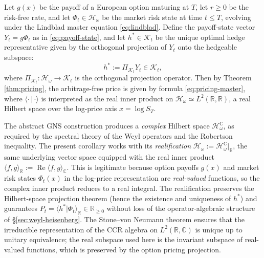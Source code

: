 \begin{corollary}
\label{cor:state-hedge-pricing}
Let $g(x)$ be the payoff of a European option maturing at $T$, let $r \geq 0$ be
the risk-free rate, and let $\Phi_t \in \mathcal{H}_\omega$ be the market risk
state at time $t \leq T$, evolving under the Lindblad master equation
\eqref{eq:lindblad}. Define the payoff-state vector $Y_t = g \Phi_t$ as in
\eqref{eq:payoff-state}, and let $h^* \in \mathcal{K}_t$ be the unique optimal
hedge representative given by the orthogonal projection of $Y_t$ onto the hedgeable
subspace:
\begin{equation}\label{eq:optimal-hedge-time}
    h^* := \Pi_{\mathcal{K}_t} Y_t \in \mathcal{K}_t,
\end{equation}
where $\Pi_{\mathcal{K}_t} : \mathcal{H}_\omega \to \mathcal{K}_t$ is the
orthogonal projection operator. Then by Theorem \ref{thm:pricing}, the
arbitrage-free price is given by formula \eqref{eq:pricing-master}, where
$\langle \cdot \,|\, \cdot \rangle$ is interpreted as the real inner product on
$\mathcal{H}_\omega \simeq L^2(\mathbb{R}, \mathbb{R})$, a real Hilbert space over
the log-price axis $x = \log S_T$.

\begin{remark}\label{rem:real-vs-complex}
The abstract GNS construction produces a \emph{complex} Hilbert space
$\mathcal{H}_\omega^{\mathbb{C}}$, as required by the spectral theory of the
Weyl operators and the Robertson inequality. The present corollary works
with its \emph{realification}
$\mathcal{H}_\omega := \mathcal{H}_\omega^{\mathbb{C}}|_{\mathbb{R}}$,
the same underlying vector space equipped with the real inner product
$\langle f,g\rangle_{\mathbb{R}} := \operatorname{Re}\langle f,g\rangle_{\mathbb{C}}$.
This is legitimate because option payoffs $g(x)$ and market risk states $\Phi_t(x)$
in the log-price representation are \emph{real-valued} functions, so the complex
inner product reduces to a real integral. The realification preserves the
Hilbert-space projection theorem (hence the existence and uniqueness of $h^*$)
and guarantees $P_t = \langle h^*|\Phi_t\rangle_{\mathbb{R}} \in \mathbb{R}_{\geq 0}$
without loss of the operator-algebraic structure of \S\ref{sec:weyl-heisenberg}.
The Stone--von Neumann theorem \citep{vonNeumann1931} ensures that the irreducible
representation of the CCR algebra on $L^2(\mathbb{R},\mathbb{C})$ is unique up
to unitary equivalence; the real subspace used here is the invariant subspace
of real-valued functions, which is preserved by the option pricing projection.
\end{remark}
\end{corollary}


